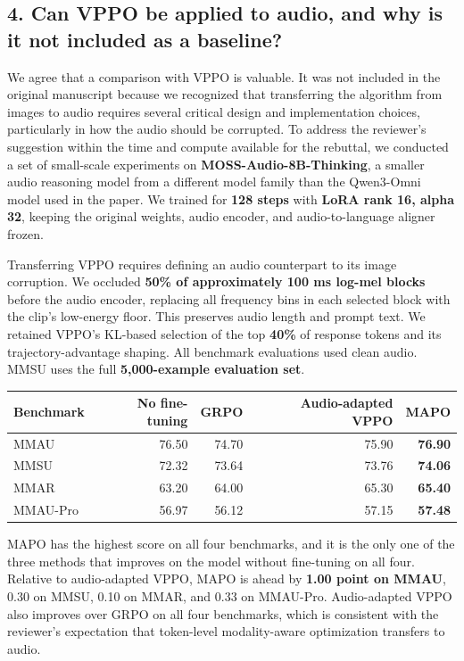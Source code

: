 \subsection*{4. Can VPPO be applied to audio, and why is it not included as a baseline?}

We agree that a comparison with VPPO is valuable. It was not included in the original manuscript because we recognized that transferring the algorithm from images to audio requires several critical design and implementation choices, particularly in how the audio should be corrupted. To address the reviewer's suggestion within the time and compute available for the rebuttal, we conducted a set of small-scale experiments on \textbf{MOSS-Audio-8B-Thinking}, a smaller audio reasoning model from a different model family than the Qwen3-Omni model used in the paper. We trained for \textbf{128 steps} with \textbf{LoRA rank 16, alpha 32}, keeping the original weights, audio encoder, and audio-to-language aligner frozen.

Transferring VPPO requires defining an audio counterpart to its image corruption. We occluded \textbf{50\% of approximately 100 ms log-mel blocks} before the audio encoder, replacing all frequency bins in each selected block with the clip's low-energy floor. This preserves audio length and prompt text. We retained VPPO's KL-based selection of the top \textbf{40\%} of response tokens and its trajectory-advantage shaping. All benchmark evaluations used clean audio. MMSU uses the full \textbf{5,000-example evaluation set}.

\par\medskip
\begingroup
\small
\setlength{\tabcolsep}{5pt}
\renewcommand{\arraystretch}{1.2}
\noindent\begin{tabularx}{\linewidth}{@{}LRRRR@{}}
\toprule
\textbf{Benchmark} & \textbf{No fine-tuning} & \textbf{GRPO} & \textbf{Audio-adapted VPPO} & \textbf{MAPO} \\
\midrule
MMAU & 76.50 & 74.70 & 75.90 & \textbf{76.90} \\
MMSU & 72.32 & 73.64 & 73.76 & \textbf{74.06} \\
MMAR & 63.20 & 64.00 & 65.30 & \textbf{65.40} \\
MMAU-Pro & 56.97 & 56.12 & 57.15 & \textbf{57.48} \\
\bottomrule
\end{tabularx}
\par\endgroup\medskip

MAPO has the highest score on all four benchmarks, and it is the only one of the three methods that improves on the model without fine-tuning on all four. Relative to audio-adapted VPPO, MAPO is ahead by \textbf{1.00 point on MMAU}, 0.30 on MMSU, 0.10 on MMAR, and 0.33 on MMAU-Pro. Audio-adapted VPPO also improves over GRPO on all four benchmarks, which is consistent with the reviewer's expectation that token-level modality-aware optimization transfers to audio.

